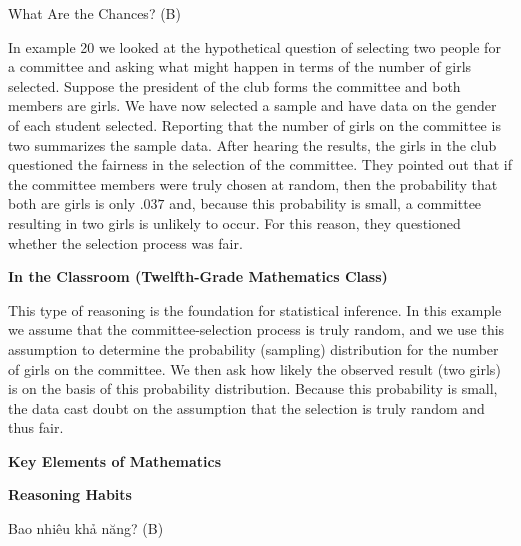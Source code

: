 \TriExample
  {
    What Are the Chances? (B)
  }
  {
    In example 20 we looked at the hypothetical question of selecting two people for a committee and asking what might happen in terms of the number of girls selected. Suppose the president of the club forms the committee and both members are girls. We have now selected a sample and have data on the gender of each student selected. Reporting that the number of girls on the committee is two summarizes the sample data. After hearing the results, the girls in the club questioned the fairness in the selection of the committee. They pointed out that if the committee members were truly chosen at random, then the probability that both are girls is only $.037$ and, because this probability is small, a committee resulting in two girls is unlikely to occur. For this reason, they questioned whether the selection process was fair.

    \textbf{In the Classroom (Twelfth-Grade Mathematics Class)}

    This type of reasoning is the foundation for statistical inference. In this example we assume that the committee-selection process is truly random, and we use this assumption to determine the probability (sampling) distribution for the number of girls on the committee. We then ask how likely the observed result (two girls) is on the basis of this probability distribution. Because this probability is small, the data cast doubt on the assumption that the selection is truly random and thus fair.

    \textbf{Key Elements of Mathematics}

    \begin{hanglist}
    \end{hanglist}

    \textbf{Reasoning Habits}

    \begin{hanglist}

    \end{hanglist}
  }
  {
    Bao nhiêu khả năng? (B)
  }
